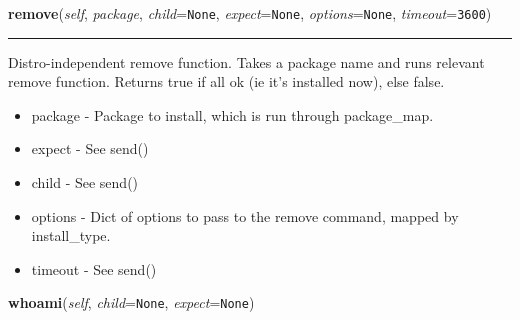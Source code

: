 \hspace{.8\funcindent}\begin{boxedminipage}{\funcwidth}

    \raggedright \textbf{remove}(\textit{self}, \textit{package}, \textit{child}={\tt None}, \textit{expect}={\tt None}, \textit{options}={\tt None}, \textit{timeout}={\tt 3600})

    \vspace{-1.5ex}

    \rule{\textwidth}{0.5\fboxrule}
\setlength{\parskip}{2ex}
    Distro-independent remove function. Takes a package name and runs 
    relevant remove function. Returns true if all ok (ie it's installed 
    now), else false.

    \begin{itemize}
    \setlength{\parskip}{0.6ex}
      \item package  - Package to install, which is run through package\_map.

      \item expect   - See send()

      \item child    - See send()

      \item options  - Dict of options to pass to the remove command, mapped by
        install\_type.

      \item timeout  - See send()

    \end{itemize}

\setlength{\parskip}{1ex}
    \end{boxedminipage}

    \label{shutit_global:ShutIt:whoami}

    \vspace{0.5ex}

\hspace{.8\funcindent}\begin{boxedminipage}{\funcwidth}

    \raggedright \textbf{whoami}(\textit{self}, \textit{child}={\tt None}, \textit{expect}={\tt None})

\setlength{\parskip}{2ex}
\setlength{\parskip}{1ex}
    \end{boxedminipage}

    \label{shutit_global:ShutIt:exec_shell}

